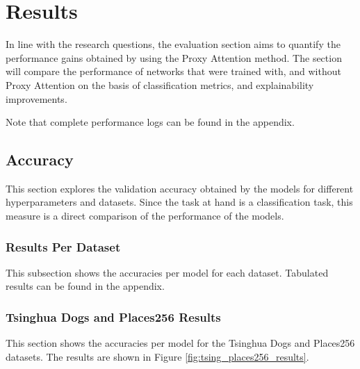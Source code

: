\chapter{Results} \label{ch:results}
In line with the research questions, the evaluation section aims to quantify the performance gains obtained by using the Proxy Attention method. The section will compare the performance of networks that were trained with, and without Proxy Attention on the basis of classification metrics, and explainability improvements.

Note that complete performance logs can be found in the appendix.
\section{Accuracy}
This section explores the validation accuracy obtained by the models for different hyperparameters and datasets. Since the task at hand is a classification task, this measure is a direct comparison of the performance of the models.

\subsection{Results Per Dataset}
This subsection shows the accuracies per model for each dataset. Tabulated results can be found in the appendix.

\subsection{Tsinghua Dogs and Places256 Results}
This section shows the accuracies per model for the Tsinghua Dogs and Places256 datasets. The results are shown in Figure \ref{fig:tsing_places256_results}.

